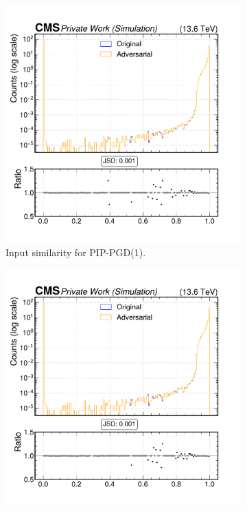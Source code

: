\begin{figure}[h]
  \centering
  \begin{subfigure}[t]{0.32\textwidth}
    \includegraphics[width=\linewidth]{media/output/features/compare/combined_it_1/cmp_cpf_arr_Cpfcan_BtagPf_trackPParRatio.pdf}
    \caption*{Input similarity for PIP-PGD(1).}
  \end{subfigure}\hfill
  \begin{subfigure}[t]{0.32\textwidth}
    \includegraphics[width=\linewidth]{media/output/features/compare/combined_it_2/cmp_cpf_arr_Cpfcan_BtagPf_trackPParRatio.pdf}

\end{subfigure}
\end{figure}
